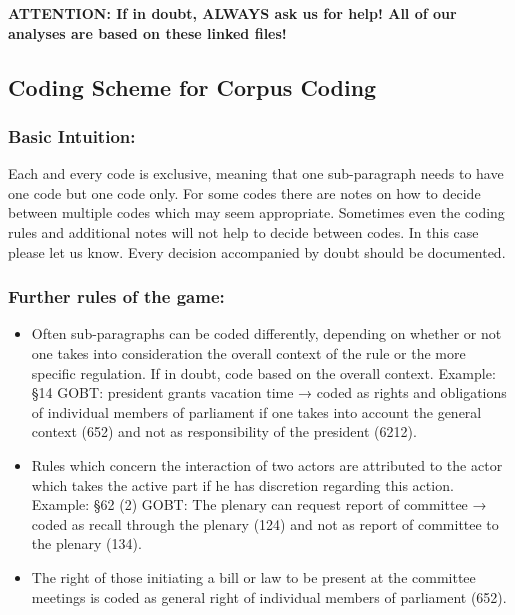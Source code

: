 \documentclass[10pt,]{article}
\begin{document}
\textbf{ATTENTION: If in doubt, ALWAYS ask us for help! All of our
analyses are based on these linked files!}

\newpage

\subsection{Coding Scheme for Corpus
Coding}\label{coding-scheme-for-corpus-coding}

\subsubsection{Basic Intuition:}\label{basic-intuition}

Each and every code is exclusive, meaning that one sub-paragraph needs
to have one code but one code only. For some codes there are notes on
how to decide between multiple codes which may seem appropriate.
Sometimes even the coding rules and additional notes will not help to
decide between codes. In this case please let us know. Every decision
accompanied by doubt should be documented.

\subsubsection{Further rules of the
game:}\label{further-rules-of-the-game}

\begin{itemize}
\item
  Often sub-paragraphs can be coded differently, depending on whether or
  not one takes into consideration the overall context of the rule or
  the more specific regulation. If in doubt, code based on the overall
  context. Example: §14 GOBT: president grants vacation time → coded as
  rights and obligations of individual members of parliament if one
  takes into account the general context (652) and not as responsibility
  of the president (6212).
\item
  Rules which concern the interaction of two actors are attributed to
  the actor which takes the active part if he has discretion regarding
  this action. Example: §62 (2) GOBT: The plenary can request report of
  committee → coded as recall through the plenary (124) and not as
  report of committee to the plenary (134).
\item
  The right of those initiating a bill or law to be present at the
  committee meetings is coded as general right of individual members of
  parliament (652).
\end{itemize}
\end{document}
